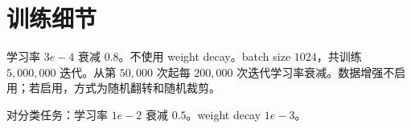 \documentclass[a4paper]{article}
\begin{document}
\section{训练细节}

学习率 $3e-4$ 衰减 $0.8$。不使用 weight decay。batch size $1024$，共训练 $5,000,000$ 迭代。从第 $50,000$ 次起每 $200,000$ 次迭代学习率衰减。数据增强不启用；若启用，方式为随机翻转和随机裁剪。

对分类任务：学习率 $1e-2$ 衰减 $0.5$。weight decay $1e-3$。
\end{document}
